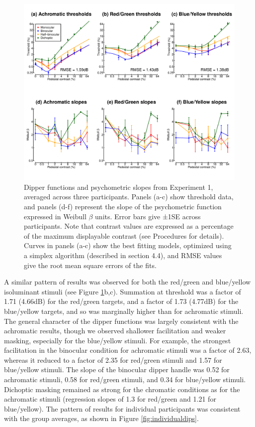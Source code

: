 \documentclass[
]{article}
\begin{document}
\begin{figure}

{\centering \includegraphics{Figures/dipperssimplex} 

}

\caption{Dipper functions and psychometric slopes from Experiment 1, averaged across three participants. Panels (a-c) show threshold data, and panels (d-f) represent the slope of the psychometric function expressed in Weibull $\beta$ units. Error bars give ±1SE across participants. Note that contrast values are expressed as a percentage of the maximum displayable contrast (see Procedures for details). Curves in panels (a-c) show the best fitting models, optimized using a simplex algorithm (described in section 4.4), and RMSE values give the root mean square errors of the fits.}\label{fig:dipperfig}
\end{figure}

A similar pattern of results was observed for both the red/green and blue/yellow isoluminant stimuli (see Figure \ref{fig:dipperfig}b,c). Summation at threshold was a factor of 1.71 (4.66dB) for the red/green targets, and a factor of 1.73 (4.77dB) for the blue/yellow targets, and so was marginally higher than for achromatic stimuli. The general character of the dipper functions was largely consistent with the achromatic results, though we observed shallower facilitation and weaker masking, especially for the blue/yellow stimuli. For example, the strongest facilitation in the binocular condition for achromatic stimuli was a factor of 2.63, whereas it reduced to a factor of 2.35 for red/green stimuli and 1.57 for blue/yellow stimuli. The slope of the binocular dipper handle was 0.52 for achromatic stimuli, 0.58 for red/green stimuli, and 0.34 for blue/yellow stimuli. Dichoptic masking remained as strong for the chromatic conditions as for the achromatic stimuli (regression slopes of 1.3 for red/green and 1.21 for blue/yellow). The pattern of results for individual participants was consistent with the group averages, as shown in Figure \ref{fig:individualdips}.
\end{document}
